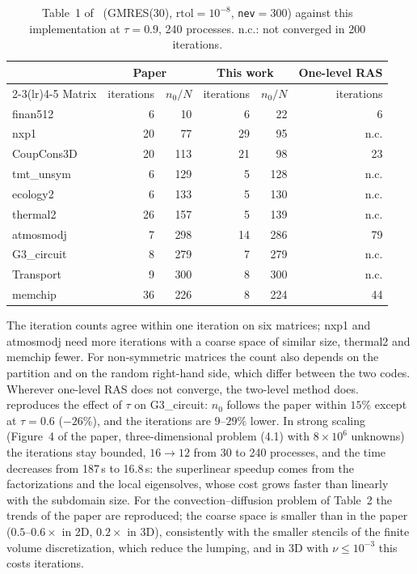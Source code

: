 \documentclass[11pt,a4paper]{article}
\begin{document}
\begin{table}[t]
\centering\small
\caption{Table~1 of~\cite{AlDaas2023} (GMRES(30), $\mathrm{rtol}=10^{-8}$, \texttt{nev}$=300$) against this
implementation at $\tau=0.9$, 240 processes. n.c.: not converged in 200 iterations.}\label{tab:table1}
\begin{tabular}{@{}lrrrrr@{}}
\toprule
& \multicolumn{2}{c}{Paper} & \multicolumn{2}{c}{This work} & One-level RAS\\
\cmidrule(lr){2-3}\cmidrule(lr){4-5}
Matrix & iterations & $n_0/N$ & iterations & $n_0/N$ & iterations\\
\midrule
finan512    & 6  & 10  & 6  & 22  & 6\\
nxp1        & 20 & 77  & 29 & 95  & n.c.\\
CoupCons3D  & 20 & 113 & 21 & 98  & 23\\
tmt\_unsym  & 6  & 129 & 5  & 128 & n.c.\\
ecology2    & 6  & 133 & 5  & 130 & n.c.\\
thermal2    & 26 & 157 & 5  & 139 & n.c.\\
atmosmodj   & 7  & 298 & 14 & 286 & 79\\
G3\_circuit & 8  & 279 & 7  & 279 & n.c.\\
Transport   & 9  & 300 & 8  & 300 & n.c.\\
memchip     & 36 & 226 & 8  & 224 & 44\\
\bottomrule
\end{tabular}
\end{table}

The iteration counts agree within one iteration on six matrices; nxp1 and atmosmodj need more iterations
with a coarse space of similar size, thermal2 and memchip fewer. For non-symmetric matrices the count also
depends on the partition and on the random right-hand side, which differ between the two codes. Wherever
one-level RAS does not converge, the two-level method does.  reproduces the effect of $\tau$ on
G3\_circuit: $n_0$ follows the paper within $15\%$ except at $\tau=0.6$ ($-26\%$), and the iterations are
$9$--$29\%$ lower. In strong scaling (Figure~4 of the paper, three-dimensional problem (4.1) with
$8\times10^6$ unknowns) the iterations stay bounded, $16\to12$ from 30 to 240 processes, and the time
decreases from 187\,s to 16.8\,s: the superlinear speedup comes from the factorizations and the local
eigensolves, whose cost grows faster than linearly with the subdomain size. For the convection--diffusion
problem of Table~2 the trends of the paper are reproduced; the coarse space is smaller than in the paper
($0.5$--$0.6\times$ in 2D, $0.2\times$ in 3D), consistently with the smaller stencils of the finite volume
discretization, which reduce the lumping, and in 3D with $\nu\leq10^{-3}$ this costs iterations.
\end{document}
